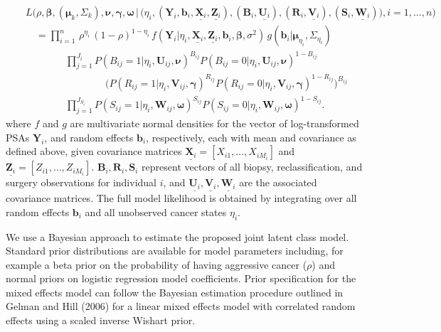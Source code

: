\documentclass[12pt, letterpaper]{article}
\newcommand{\bmbeta}{\boldsymbol{\beta}}
\newcommand{\bmnu}{\boldsymbol{\nu}}
\newcommand{\bmmu}{\boldsymbol{\mu}}
\newcommand{\bmgamma}{\boldsymbol{\gamma}}
\newcommand{\bmomega}{\boldsymbol{\omega}}
\newcommand{\bmY}{\mathbf{Y}}
\newcommand{\bmZ}{\mathbf{Z}}
\newcommand{\bmX}{\mathbf{X}}
\newcommand{\bmV}{\mathbf{V}}
\newcommand{\bmW}{\mathbf{W}}
\newcommand{\bmU}{\mathbf{U}}
\newcommand{\bmb}{\mathbf{b}}
\newcommand{\bea}{\begin{eqnarray}}
\newcommand{\eea}{\end{eqnarray}}
\newcommand{\mydots}{...}
\begin{document}
\bea
&&L\Big(\rho, \bmbeta, (\bmmu_k, \Sigma_k), \bmnu, \bmgamma, \bmomega \, | \,\big( \eta_i, (\bmY_i, \bmb_i, \underline{\bmX_i}, \underline{\bmZ_i}), (\mathbf{B}_{i}, \underline{\bmU_{i}}), (\mathbf{R}_{i}, \underline{\bmV_{i}}), (\mathbf{S}_{i}, \underline{\bmW_{i}}) \big), i=1,\mydots,n \Big) \nonumber \\
&& \quad =  \prod_{i=1}^{n}  \,  \rho^{\eta_i}\,(1-\rho)^{1-\eta_i}\, f(\bmY_i | \eta_i, \underline{\bmX_i}, \underline{\bmZ_i}, \bmb_i, \bmbeta, \sigma^2) \, g(\bmb_i |  \bmmu_{\eta_i}, \Sigma_{\eta_i})  \nonumber \\
&& \qquad \qquad \prod_{j=1}^{J_i}  P(B_{ij}=1 | \eta_i, \bmU_{ij}, \bmnu) ^{B_{ij}} P(B_{ij}=0 | \eta_i, \bmU_{ij}, \bmnu)^{1-B_{ij}}  \nonumber \\
&& \qquad \qquad \qquad  \qquad \big(P(R_{ij}=1 | \eta_i, \bmV_{ij}, \bmgamma) ^{R_{ij}} P(R_{ij}=0 | \eta_i, \bmV_{ij}, \bmgamma)^{1-R_{ij}} \big)^{B_{ij}} \nonumber \\
\label{eq:lik-inf}
&& \qquad \qquad  \prod_{j=1}^{J_{S_i}}  P(S_{ij}=1 | \eta_i, \bmW_{ij}, \bmomega) ^{S_{ij}} P(S_{ij}=0 | \eta_i, \bmW_{ij}, \bmomega)^{1-S_{ij}} .
\eea
where $f$ and $g$ are multivariate normal densities for the vector of log-transformed PSAs $\bmY_i$, and random effects $\bmb_i$, respectively, each with mean and covariance as defined above, given covariance matrices $\underline{\bmX_i} = [X_{i1},\dots, X_{iM_i}]$ and $\underline{\bmZ_i} = [Z_{i1},\dots, Z_{iM_i}]$. $\mathbf{B}_{i}, \mathbf{R}_{i}, \mathbf{S}_{i}$ represent vectors of all biopsy, reclassification, and surgery observations for individual $i$, and $\underline{\bmU_{i}},\underline{\bmV_{i}}, \underline{\bmW_{i}}$ are the associated covariance matrices. The full model likelihood is obtained by integrating over all random effects $\bmb_i$ and all unobserved cancer states $\eta_i$.

We use a Bayesian approach to estimate the proposed joint latent class model. Standard prior distributions are available for model parameters including, for example a beta prior on the probability of having aggressive cancer ($\rho$) and normal priors on logistic regression model coefficients. Prior specification for the mixed effects model can follow the Bayesian estimation procedure outlined in Gelman and Hill (2006) for a linear mixed effects model with correlated random effects using a scaled inverse Wishart prior\nocite{Gelman2006}. 
\end{document}
